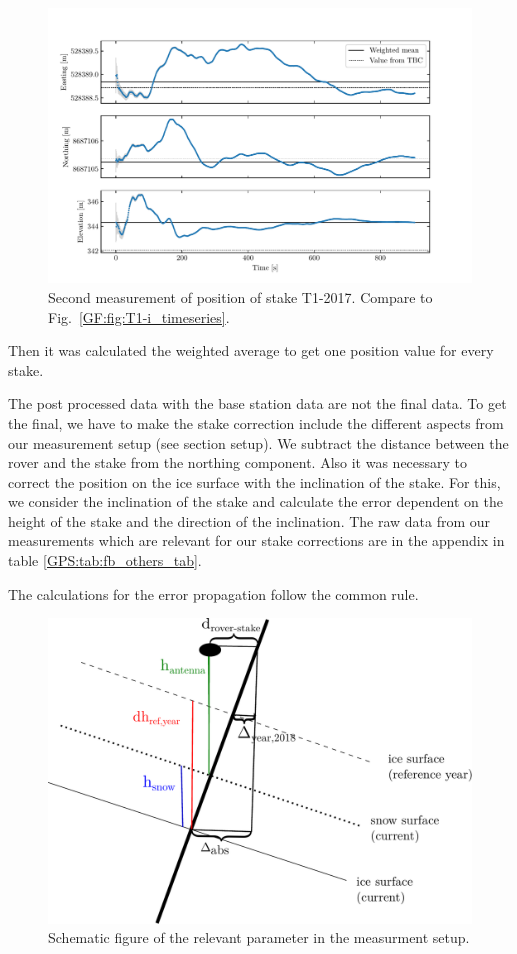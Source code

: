 \begin{figure}[H]
    \centering
    \includegraphics[width=\textwidth]{./figs/timeseries/46250723_corr-T1-ii-2017_Timeseries-east-north-elev.pdf}
    \caption{Second measurement of position of stake T1-2017. Compare to Fig.~\ref{GF:fig:T1-i_timeseries}.}
    \label{GF:fig:T1-ii_timeseries}
\end{figure}

Then it was calculated the weighted average to get one position value for every stake.

The post processed data with the base station data are not the final data. 
To get the final, we have to make the stake correction include the different aspects from our measurement setup (see section setup).
We subtract the distance between the rover and the stake from the northing component.
Also it was necessary to correct the position on the ice surface with the inclination of the stake. 
For this, we consider the inclination of the stake and calculate the error dependent on the height of the stake and the direction of the inclination.
The raw data from our measurements which are relevant for our stake corrections are in the appendix in table \ref{GPS:tab:fb_others_tab}.
\medskip

The calculations for the error propagation follow the common rule.

\begin{figure}
\centering
\includegraphics[width=0.9\linewidth]{./figs/pictures/schematic_setup.pdf}
\caption{Schematic figure of the relevant parameter in the measurment setup.}
\end{figure}

